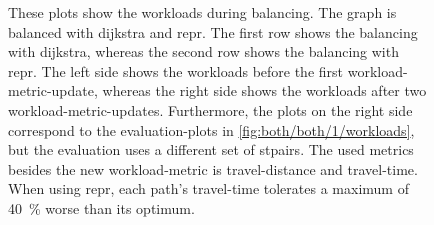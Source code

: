         \begin{figure}[hbp]
            \centering%
            \hfill%

            \hfill%
            \caption[Workloads during balancing in comparison]{%
                These plots show the workloads during \gls{balancing}.
                The graph is balanced with \gls{dijkstra} and \gls{repr}.
                The first row shows the \gls{balancing} with \gls{dijkstra}, whereas the second row shows the \gls{balancing} with \gls{repr}.
                The left side shows the workloads before the first workload-\gls{metric}-update, whereas the right side shows the workloads after two workload-\gls{metric}-updates.
                Furthermore, the plots on the right side correspond to the evaluation-plots in \vref{fig:both/both/1/workloads}, but the evaluation uses a different set of \glspl{stpair}.
                The used \glspl{metric} besides the new workload-\gls{metric} is travel-distance and travel-time.
                When using \gls{repr}, each path's travel-time tolerates a maximum of \si{\num{40} \percent} worse than its optimum.
                \label{fig:both/2/workloads}
            }
        \end{figure}

